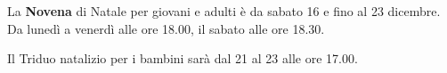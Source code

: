 
\vspace{1em}
\small

La \textbf{Novena} di Natale per giovani e adulti è da sabato 16 e fino al 23 dicembre. Da lunedì a venerdì alle ore 18.00, il sabato alle ore 18.30.

Il Triduo natalizio per i bambini sarà dal 21 al 23 alle ore 17.00.


